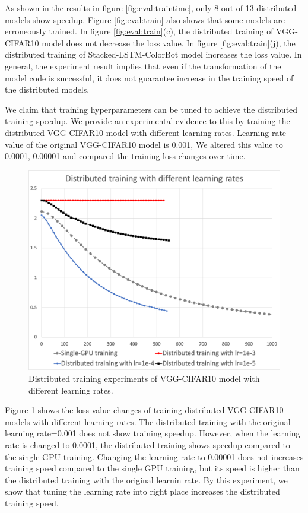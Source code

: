 As shown in the results in figure \ref{fig:eval:traintime},
only 8 out of 13 distributed models show speedup. 
Figure \ref{fig:eval:train} also shows that some models are erroneously trained.
In figure \ref{fig:eval:train}(c), the distributed training of
VGG-CIFAR10 model does not decrease the loss value.
In figure \ref{fig:eval:train}(j), the distributed training of
Stacked-LSTM-ColorBot model increases the loss value.
In general, the experiment result implies that even if the transformation
of the model code is successful, it does not guarantee
increase in the training speed of the distributed models.

We claim that training hyperparameters can be tuned to
achieve the distributed training speedup.
We provide an experimental evidence to this by
training the distributed VGG-CIFAR10 model with
different learning rates.
Learning rate value of the original VGG-CIFAR10 model is 0.001,
We altered this value to 0.0001, 0.00001
and compared the training loss changes over time.

\begin{figure}[!ht]
  \centering
  \includegraphics[width=.7\textwidth]{lr-exp-graph}

  \caption{Distributed training experiments of VGG-CIFAR10 model with different learning rates.}
  \label{fig:eval:cifar10}
\end{figure}

Figure \ref{fig:eval:cifar10} shows the loss value changes of training 
distributed VGG-CIFAR10 models with different learning rates.
The distributed training with the original learning rate=0.001 does not show
training speedup.
However, when the learning rate is changed to 0.0001,
the distributed training shows speedup compared to the single GPU training.
Changing the learning rate to 0.00001 does not increases training speed
compared to the single GPU training, but its speed is higher than
the distributed training with the original learnin rate.
By this experiment, we show that tuning the learning rate into right place 
increases the distributed training speed.  

